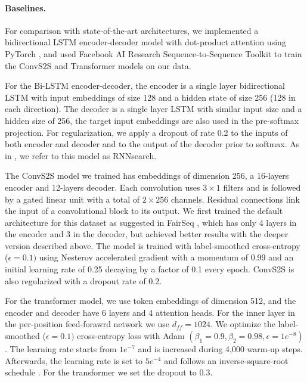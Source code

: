 \documentclass[11pt,a4paper]{article}
\begin{document}
\paragraph{Baselines.}
For comparison with state-of-the-art architectures, we implemented a bidirectional LSTM encoder-decoder model with dot-product attention \cite{bahdanau15iclr, luong15emnlp} using PyTorch \cite{paszke17nipsw}, and used Facebook AI Research Sequence-to-Sequence Toolkit \cite{gehring17icml} to train the ConvS2S and  Transformer \cite{vaswani17nips} models on our data.

For the Bi-LSTM encoder-decoder, the encoder is a single layer bidirectional LSTM with input embeddings of size 128 and a hidden state of size 256 (128 in each direction). The decoder is a single layer LSTM with similar input size and a hidden size of 256, the target input embeddings are also used in the pre-softmax projection. For regularization, we apply a dropout of rate 0.2 to the inputs of both encoder and decoder and to the output of the decoder prior to softmax. As in \cite{bahdanau15iclr}, we  refer to this model as RNNsearch.

The ConvS2S model we trained has embeddings of dimension 256, a 16-layers encoder and 12-layers decoder. Each convolution uses $3\!\times\!1$ filters and is followed by a gated linear unit with a total of $2 \times 256$ channels. Residual connections link the input of a convolutional block to its output.
We first trained the default architecture for this dataset as suggested in FairSeq \cite{gehring17icml}, which has only 4 layers in the encoder and 3 in the decoder, but achieved better results with the deeper version described above.
The model is trained with label-smoothed cross-entropy ($\epsilon=0.1)$ using Nesterov accelerated gradient  with a momentum of 0.99 and an initial learning rate of 0.25 decaying by a factor of 0.1 every epoch. ConvS2S is also regularized with a dropout rate of 0.2.

For the transformer model,
we use token embeddings of dimension 512, and the encoder and decoder have 6 layers and 4 attention heads. For the inner layer in the per-position feed-forawrd network we use $d_{ff}=1024$.
We optimize the label-smoothed ($\epsilon=0.1)$ cross-entropy loss with Adam $(\beta_1=0.9, \beta_2=0.98, \epsilon=1e^{-8})$ \cite{kingma15iclr}. The learning rate starts from $1e^{-7}$ and is increased during 4,000 warm-up steps. Afterwards, the learning rate is set to $5e^{-4}$ and follows an inverse-square-root schedule \cite{vaswani17nips}. For the transformer we set the dropout to $0.3$.
\end{document}
